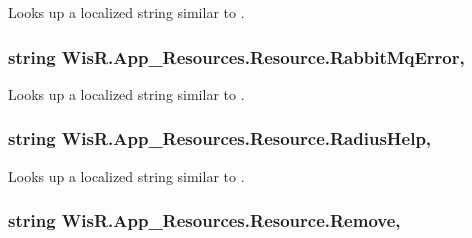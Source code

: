 Looks up a localized string similar to . 

\hypertarget{class_wis_r_1_1_app___resources_1_1_resource_a6f2e853d37c61abd70c464f4c5d5ecc2}{}
\subsubsection[{Rabbit\+Mq\+Error}]{\setlength{\rightskip}{0pt plus 5cm}string Wis\+R.\+App\+\_\+\+Resources.\+Resource.\+Rabbit\+Mq\+Error\hspace{0.3cm}{\ttfamily [static]}, {\ttfamily [get]}}\label{class_wis_r_1_1_app___resources_1_1_resource_a6f2e853d37c61abd70c464f4c5d5ecc2}


Looks up a localized string similar to . 

\hypertarget{class_wis_r_1_1_app___resources_1_1_resource_acc853d0b9207f9217c61ade2ace83f70}{}
\subsubsection[{Radius\+Help}]{\setlength{\rightskip}{0pt plus 5cm}string Wis\+R.\+App\+\_\+\+Resources.\+Resource.\+Radius\+Help\hspace{0.3cm}{\ttfamily [static]}, {\ttfamily [get]}}\label{class_wis_r_1_1_app___resources_1_1_resource_acc853d0b9207f9217c61ade2ace83f70}


Looks up a localized string similar to . 

\hypertarget{class_wis_r_1_1_app___resources_1_1_resource_a92c53da8a2506f34e43efa469ecc8085}{}
\subsubsection[{Remove}]{\setlength{\rightskip}{0pt plus 5cm}string Wis\+R.\+App\+\_\+\+Resources.\+Resource.\+Remove\hspace{0.3cm}{\ttfamily [static]}, {\ttfamily [get]}}\label{class_wis_r_1_1_app___resources_1_1_resource_a92c53da8a2506f34e43efa469ecc8085}


